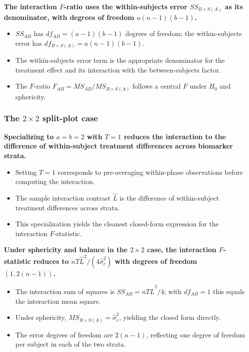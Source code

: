 \documentclass[
  11pt,
]{article}
\begin{document}
\textbf{The interaction $F$-ratio uses the within-subjects error $SS_{B \times S(A)}$ as its denominator, with degrees of freedom $a(n-1)(b-1)$.}

\begin{itemize}\setlength{\itemsep}{2pt}\setlength{\parskip}{0pt}
\item $SS_{AB}$ has $df_{AB} = (a-1)(b-1)$ degrees of freedom; the within-subjects error has $df_{B \times S(A)} = a(n-1)(b-1)$.
\item The within-subjects error term is the appropriate denominator for the treatment effect and its interaction with the between-subjects factor.
\item The $F$-ratio $F_{AB} = MS_{AB}/MS_{B \times S(A)}$ follows a central $F$ under $H_0$ and sphericity.
\end{itemize}

\subsubsection{\texorpdfstring{The \(2 \times 2\) split-plot case}{The 2 \textbackslash times 2 split-plot case}}\label{the-2-times-2-split-plot-case}

\textbf{Specializing to $a = b = 2$ with $T = 1$ reduces the interaction to the difference of within-subject treatment differences across biomarker strata.}

\begin{itemize}\setlength{\itemsep}{2pt}\setlength{\parskip}{0pt}
\item Setting $T = 1$ corresponds to pre-averaging within-phase observations before computing the interaction.
\item The sample interaction contrast $\hat{L}$ is the difference of within-subject treatment differences across strata.
\item This specialization yields the cleanest closed-form expression for the interaction $F$-statistic.
\end{itemize}

\textbf{Under sphericity and balance in the $2 \times 2$ case, the interaction $F$-statistic reduces to $nT\hat{L}^2 / (4\hat{\sigma}_e^2)$ with degrees of freedom $(1, 2(n-1))$.}

\begin{itemize}\setlength{\itemsep}{2pt}\setlength{\parskip}{0pt}
\item The interaction sum of squares is $SS_{AB} = nT\hat{L}^2/4$; with $df_{AB} = 1$ this equals the interaction mean square.
\item Under sphericity, $MS_{B \times S(A)} = \hat{\sigma}_e^2$, yielding the closed form directly.
\item The error degrees of freedom are $2(n-1)$, reflecting one degree of freedom per subject in each of the two strata.
\end{itemize}
\end{document}
